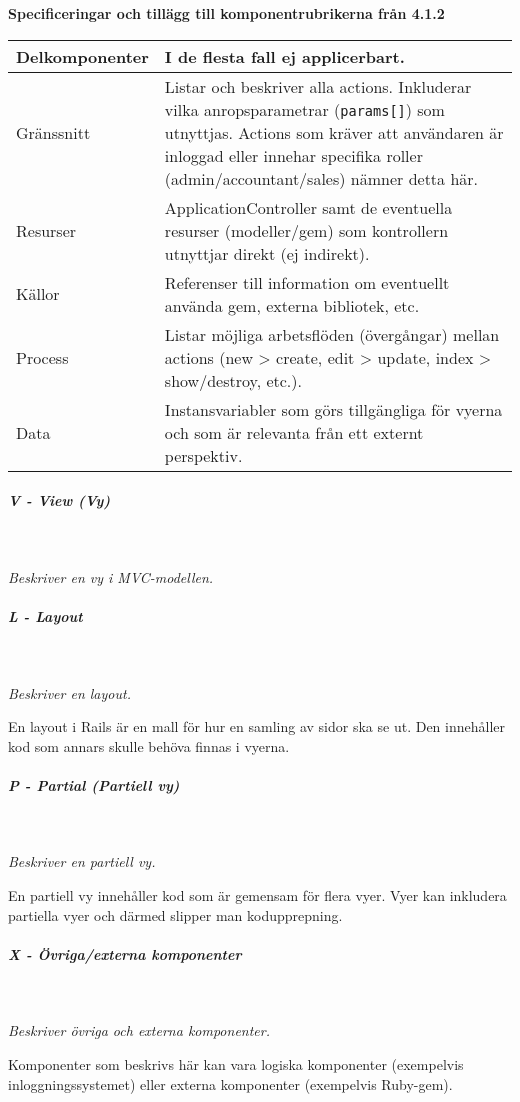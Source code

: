 \documentclass[a4paper, twoside, 11pt, titlepage]{article}
\begin{document}
				\textbf{Specificeringar och tillägg till komponentrubrikerna från 4.1.2}

				\begin {table} [ht] \begin{tabular} { p{2.6cm} p{12.5cm} }
					\hline
					{Delkomponenter} & {I de flesta fall ej applicerbart.} \\
					\hline
					{Gränssnitt} & {Listar och beskriver alla actions. Inkluderar vilka anropsparametrar ({\tt params[]}) som utnyttjas. Actions som kräver att användaren är inloggad eller innehar specifika roller (admin/accountant/sales) nämner detta här.} \\
					\hline
					{Resurser} & {ApplicationController samt de eventuella resurser (modeller/gem) som kontrollern utnyttjar direkt (ej indirekt).} \\
					\hline
					{Källor} & {Referenser till information om eventuellt använda gem, externa bibliotek, etc.} \\
					\hline
					{Process} & {Listar möjliga arbetsflöden (övergångar) mellan actions (new > create, edit > update, index > show/destroy, etc.).} \\
					\hline
					{Data} & {Instansvariabler som görs tillgängliga för vyerna och som är relevanta från ett externt perspektiv.} \\
					\hline
				\end{tabular} \end{table} \FloatBarrier


			\subparagraph{\emph{V - View (\emph{Vy})}}\

				\emph{Beskriver en vy i MVC-modellen.}

			\subparagraph{\emph{L - Layout}}\

				\emph{Beskriver en layout.}

				En layout i Rails är en mall för hur en samling av sidor ska se ut. Den innehåller kod som annars skulle behöva finnas i vyerna.

			\subparagraph{\emph{P - Partial (\emph{Partiell vy})}}\

				\emph{Beskriver en partiell vy.}

				En partiell vy innehåller kod som är gemensam för flera vyer. Vyer kan inkludera partiella vyer och därmed slipper man kodupprepning.

			\subparagraph{\emph{X - Övriga/externa komponenter}}\

				\emph{Beskriver övriga och externa komponenter.}

				Komponenter som beskrivs här kan vara logiska komponenter (exempelvis inloggningssystemet) eller externa komponenter (exempelvis Ruby-gem).
\end{document}

